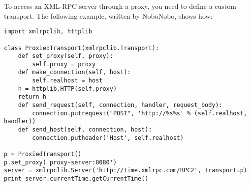 To access an XML-RPC server through a proxy, you need to define 
a custom transport.  The following example, 
written by NoboNobo, %
shows how:

\begin{verbatim}
import xmlrpclib, httplib

class ProxiedTransport(xmlrpclib.Transport):
    def set_proxy(self, proxy):
        self.proxy = proxy
    def make_connection(self, host):
        self.realhost = host
	h = httplib.HTTP(self.proxy)
	return h
    def send_request(self, connection, handler, request_body):
        connection.putrequest("POST", 'http://%s%s' % (self.realhost, handler))
    def send_host(self, connection, host):
        connection.putheader('Host', self.realhost)

p = ProxiedTransport()
p.set_proxy('proxy-server:8080')
server = xmlrpclib.Server('http://time.xmlrpc.com/RPC2', transport=p)
print server.currentTime.getCurrentTime()
\end{verbatim}

